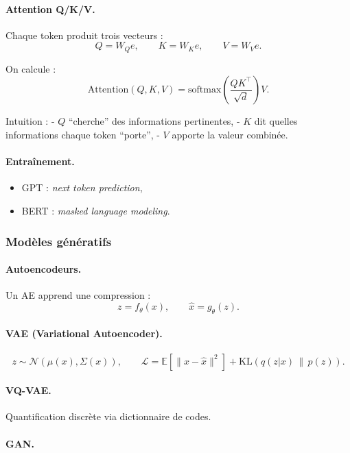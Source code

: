 \documentclass[11pt,a4paper]{article}
\newcommand{\1}{\mathbf{1}}
\begin{document}
\paragraph{Attention Q/K/V.}
Chaque token produit trois vecteurs :
\[
Q = W_Q e,\qquad K = W_K e,\qquad V = W_V e.
\]

On calcule :
\[
\mathrm{Attention}(Q,K,V)
=
\mathrm{softmax}\!\left(
\frac{QK^\top}{\sqrt{d}}
\right)V.
\]

Intuition :
- $Q$ ``cherche'' des informations pertinentes,
- $K$ dit quelles informations chaque token ``porte'',
- $V$ apporte la valeur combinée.

\paragraph{Entraînement.}

\begin{itemize}
  \item GPT : \textit{next token prediction},
  \item BERT : \textit{masked language modeling}.
\end{itemize}

\subsubsection{Modèles génératifs}

\paragraph{Autoencodeurs.}

Un AE apprend une compression :
\[
z = f_{\theta}(x),
\qquad
\hat x = g_{\theta}(z).
\]

\paragraph{VAE (Variational Autoencoder).}
\[
z \sim \mathcal{N}(\mu(x),\Sigma(x)),
\qquad
\mathcal{L} = \mathbb{E}[\|x-\hat x\|^2] + \mathrm{KL}(q(z|x)\,\|\,p(z)).
\]

\paragraph{VQ-VAE.}
Quantification discrète via dictionnaire de codes.

\paragraph{GAN.}
\end{document}
